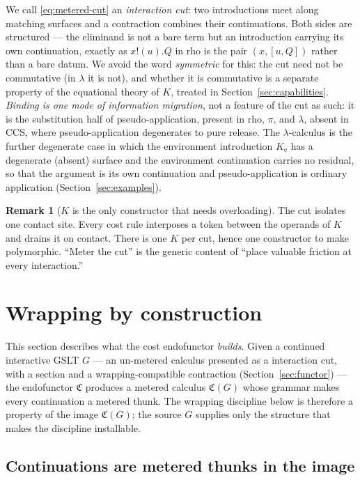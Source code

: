 \documentclass[11pt]{article}
\theoremstyle{definition}
\newtheorem{remark}[definition]{Remark}
\theoremstyle{plain}
\newcommand{\Cost}{\mathfrak{C}}              %
\newcommand{\Ke}{K_{\mathrm{e}}}
\begin{document}
%
We call \eqref{eq:metered-cut} an \emph{interaction cut}: two
introductions meet along matching surfaces and a contraction combines
their continuations. Both sides are structured --- the eliminand is not a
bare term but an introduction carrying its own continuation, exactly as
$x!(u).Q$ in rho is the pair $(x,[u,Q])$ rather than a bare datum. We
avoid the word \emph{symmetric} for this: the cut need not be commutative
(in $\lambda$ it is not), and whether it is commutative is a separate
property of the equational theory of $K$, treated in
Section~\ref{sec:capabilities}. \emph{Binding is one mode of information
migration}, not a feature of the cut as such: it is the substitution half
of pseudo-application, present in rho, $\pi$, and $\lambda$, absent in
CCS, where pseudo-application degenerates to pure release. The
$\lambda$-calculus is the further degenerate case in which the environment
introduction $\Ke$ has a degenerate (absent) surface and the environment
continuation carries no residual, so that the argument is its own
continuation and pseudo-application is ordinary application
(Section~\ref{sec:examples}).

\begin{remark}[$K$ is the only constructor that needs overloading]
The cut isolates one contact site. Every cost rule interposes a token
between the operands of $K$ and drains it on contact. There is one $K$
per cut, hence one constructor to make polymorphic. ``Meter the cut'' is
the generic content of ``place valuable friction at every interaction.''
\end{remark}

\section{Wrapping by construction}
\label{sec:wrapped}

This section describes what the cost endofunctor \emph{builds}. Given a
continued interactive GSLT $G$ --- an un-metered calculus presented as a
interaction cut, with a section and a wrapping-compatible contraction
(Section~\ref{sec:functor}) --- the endofunctor $\Cost$ produces a
metered calculus $\Cost(G)$ whose grammar makes every continuation a
metered thunk. The wrapping discipline below is therefore a property of
the image $\Cost(G)$; the source $G$ supplies only the structure that
makes the discipline installable.

\subsection{Continuations are metered thunks in the image}
\end{document}

